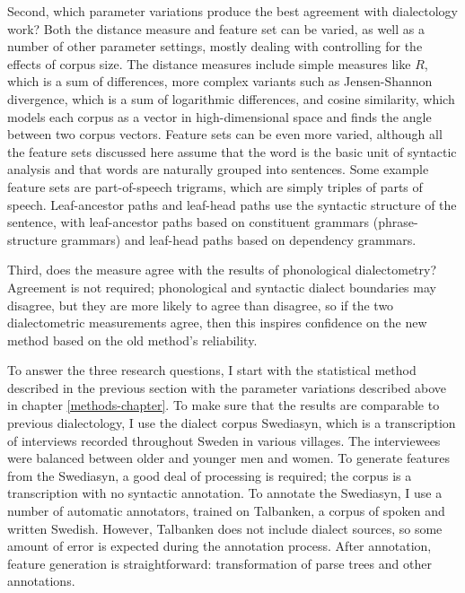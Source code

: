 Second, which parameter variations produce the best agreement with
dialectology work? Both the distance measure and feature set can be
varied, as well as a number of other parameter settings, mostly
dealing with controlling for the effects of corpus size. The distance
measures include simple measures like $R$, which is a sum of differences, more
complex variants such as Jensen-Shannon divergence, which is a sum of
logarithmic differences, and cosine similarity, which models each
corpus as a vector in high-dimensional space and finds the angle
between two corpus vectors. Feature sets can be even more varied,
although all the feature sets discussed here assume that the word is the
basic unit of syntactic analysis and that words are naturally grouped
into sentences. Some example feature sets are part-of-speech trigrams,
which are simply triples of parts of speech. Leaf-ancestor paths and
leaf-head paths use the syntactic structure of the sentence, with
leaf-ancestor paths based on constituent grammars (phrase-structure
grammars) and leaf-head paths based on dependency grammars.

Third, does the measure agree with the results of phonological
dialectometry? Agreement is not required; phonological and syntactic
dialect boundaries may disagree, but they are more likely to agree
than disagree, so if the two dialectometric measurements agree, then
this inspires confidence on the new method based on the old method's
reliability.

To answer the three research questions, I start with the statistical
method described in the previous section with the parameter variations
described above in chapter \ref{methods-chapter}. To make sure that
the results are comparable to previous dialectology, I use the dialect
corpus Swediasyn, which is a transcription of interviews recorded
throughout Sweden in various villages. The interviewees were balanced
between older and younger men and women. To generate features from the
Swediasyn, a good deal of processing is required; the corpus is a
transcription with no syntactic annotation. To annotate the Swediasyn,
I use a number of automatic annotators, trained on Talbanken, a corpus
of spoken and written Swedish. However, Talbanken does not include
dialect sources, so some amount of error is expected during the
annotation process. After annotation, feature generation is
straightforward: transformation of parse trees and other annotations.

